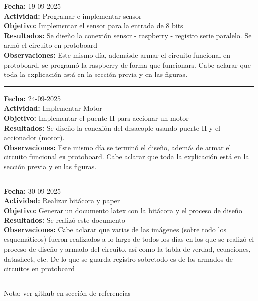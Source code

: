 \documentclass[12pt,a4paper]{article}
\newcommand{\entrada}[5]{
\noindent
\textbf{Fecha:} #1\\
\textbf{Actividad:} #2\\
\textbf{Objetivo:} #3\\
\textbf{Resultados:} #4\\
\textbf{Observaciones:} #5\\
\bigskip
\hrule
\bigskip
}
\begin{document}
\entrada{19-09-2025}{Programar e implementar sensor}{Implementar el sensor para la entrada de 8 bits}{Se diseño la conexión sensor - raspberry - registro serie paralelo. Se armó el circuito en protoboard}{Este mismo día, ademásde armar el circuito funcional en protoboard, se programó la raspberry de forma que funcionara. Cabe aclarar que toda la explicación está en la sección previa y en las figuras.}

\entrada{24-09-2025}{Implementar Motor}{Implementar el puente H para accionar un motor}{Se diseño la conexión del desacople usando puente H y el accionador (motor).}{Este mismo día se terminó el diseño, además de armar el circuito funcional en protoboard.  Cabe aclarar que toda la explicación está en la sección previa y en las figuras.}

\entrada{30-09-2025}{Realizar bitácora y paper}{Generar un documento latex con la bitácora y el proceso de diseño}{Se realizó este documento}{Cabe aclarar que varias de las imágenes (sobre todo los esquemáticos) fueron realizados a lo largo de todos los días en los que se realizó el proceso de diseño y armado del circuito, así como la tabla de verdad, ecuaciones, datasheet, etc. De lo que se guarda registro sobretodo es de los armados de circuitos en protoboard}

Nota: ver github en sección de referencias \cite{JafetDM2025_proyecto1}


\end{document}
